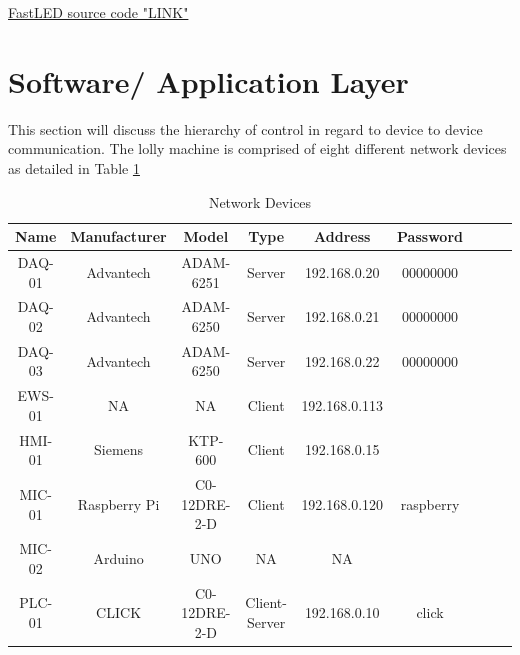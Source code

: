         \href{https://github.com/FastLED/FastLED}{FastLED source code "LINK"} \cite{FastLED} 
        
    \section{Software/ Application Layer}

    This section will discuss the hierarchy of control in regard to device to device communication. 
    The lolly machine is comprised of eight different network devices as detailed in Table \ref{table:networkDevices}

    \begin{table}[H]
        \caption{Network Devices}
        \begin{center}
            \begin{tabular}{|c|c|c|c|c|c|c|c|c|}
                \hline
                \textbf{Name} & \textbf{Manufacturer} & \textbf{Model} & \textbf{Type} & \textbf{Address}  & \textbf{Password}\\
                \hline
                DAQ-01 & Advantech & ADAM-6251 & Server & 192.168.0.20 & 00000000\\
                DAQ-02 & Advantech & ADAM-6250 & Server & 192.168.0.21 & 00000000\\
                DAQ-03 & Advantech & ADAM-6250 & Server & 192.168.0.22 & 00000000\\
                EWS-01 & NA & NA & Client & 192.168.0.113 & \\
                HMI-01 & Siemens & KTP-600 & Client & 192.168.0.15 & \\
                MIC-01 & Raspberry Pi & C0-12DRE-2-D & Client & 192.168.0.120 & raspberry\\
                MIC-02 & Arduino & UNO & NA & NA & \\
                PLC-01 & CLICK & C0-12DRE-2-D & Client-Server & 192.168.0.10 & click\\

                \hline
            \end{tabular}\\
        \end{center}
        \label{table:networkDevices}
    \end{table}
    
